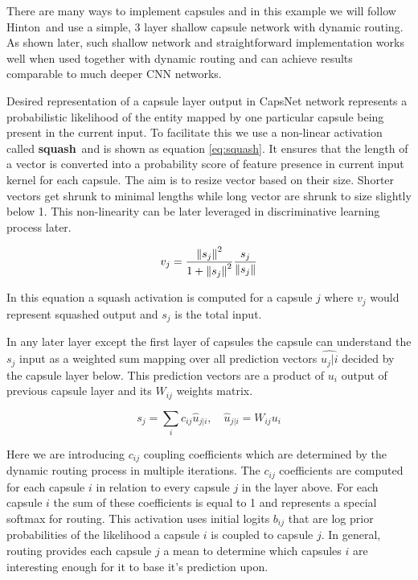 There are many ways to implement capsules and in this example we will follow Hinton\,\cite{capsule} and use a simple, 3 layer shallow capsule network with dynamic routing. As shown later, such shallow network and straightforward implementation works well when used together with dynamic routing and can achieve results comparable to much deeper CNN networks.

Desired representation of a capsule layer output in CapsNet network represents a probabilistic likelihood of the entity mapped by one particular capsule being present in the current input. To facilitate this we use a non-linear activation called \textbf{squash}\ and is shown as equation \ref{eq:squash}. It ensures that the length of a vector is converted into a probability score of feature presence in current input kernel for each capsule. The aim is to resize vector based on their size. Shorter vectors get shrunk to minimal lengths while long vector are shrunk to size slightly below 1. This non-linearity can be later leveraged in discriminative learning process later.

\begin{equation}
    v_j = \frac{\left\lVert s_j \right\rVert^2}{1 + \left\lVert s_j \right\rVert^2} \frac{s_j}{\left\lVert s_j \right\rVert}
    \label{eq:squash}
\end{equation}

In this equation a squash activation is computed for a capsule $j$ where $v_j$ would represent squashed output and $s_j$ is the total input.

In any later layer except the first layer of capsules the capsule can understand the $s_j$ input as a weighted sum mapping over all prediction vectors $\hat{u_j|i}$ decided by the capsule layer below. This prediction vectors are a product of $u_i$ output of previous capsule layer and its $W_{ij}$ weights matrix.

\begin{equation}
    s_j = \sum_{i}c_{ij}\hat{u}_{j|i},\quad \hat{u}_{j|i} = W_{ij}u_i
    \label{eq:capsule}
\end{equation}

Here we are introducing $c_{ij}$ coupling coefficients which are determined by the dynamic routing process in multiple iterations. The $c_{ij}$ coefficients are computed for each capsule $i$ in relation to every capsule $j$ in the layer above. For each capsule $i$ the sum of these coefficients is equal to 1 and represents a special softmax for routing. This activation uses initial logits $b_{ij}$ that are log prior probabilities of the likelihood a capsule $i$ is coupled to capsule $j$. In general, routing provides each capsule $j$ a mean to determine which capsules $i$ are interesting enough for it to base it's prediction upon.

